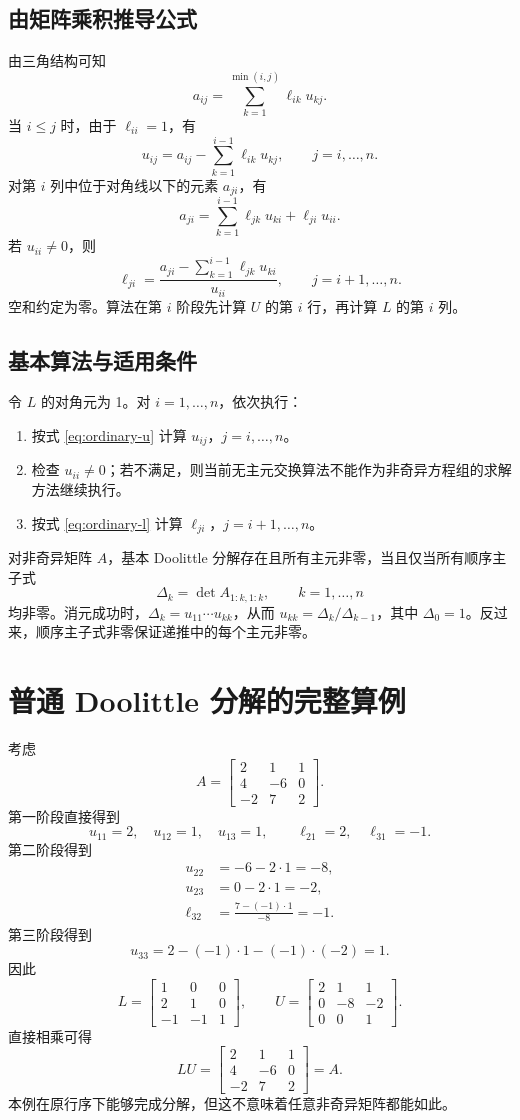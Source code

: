 \documentclass[UTF8,11pt,a4paper,fontset=fandol]{ctexart}
\newcommand{\mat}[1]{\begin{bmatrix}#1\end{bmatrix}}
\begin{document}
\subsection{由矩阵乘积推导公式}
由三角结构可知
\[
a_{ij}=\sum_{k=1}^{\min(i,j)}\ell_{ik}u_{kj}.
\]
当 $i\le j$ 时，由于 $\ell_{ii}=1$，有
\begin{equation}
\boxed{u_{ij}=a_{ij}-\sum_{k=1}^{i-1}\ell_{ik}u_{kj}},\qquad j=i,\ldots,n.
\label{eq:ordinary-u}
\end{equation}
对第 $i$ 列中位于对角线以下的元素 $a_{ji}$，有
\[
a_{ji}=\sum_{k=1}^{i-1}\ell_{jk}u_{ki}+\ell_{ji}u_{ii}.
\]
若 $u_{ii}\ne0$，则
\begin{equation}
\boxed{\ell_{ji}=\frac{a_{ji}-\sum_{k=1}^{i-1}\ell_{jk}u_{ki}}{u_{ii}}},\qquad j=i+1,\ldots,n.
\label{eq:ordinary-l}
\end{equation}
空和约定为零。算法在第 $i$ 阶段先计算 $U$ 的第 $i$ 行，再计算 $L$ 的第 $i$ 列。

\subsection{基本算法与适用条件}
令 $L$ 的对角元为 1。对 $i=1,\ldots,n$，依次执行：
\begin{enumerate}
\item 按式 \eqref{eq:ordinary-u} 计算 $u_{ij}$，$j=i,\ldots,n$。
\item 检查 $u_{ii}\ne0$；若不满足，则当前无主元交换算法不能作为非奇异方程组的求解方法继续执行。
\item 按式 \eqref{eq:ordinary-l} 计算 $\ell_{ji}$，$j=i+1,\ldots,n$。
\end{enumerate}
对非奇异矩阵 $A$，基本 Doolittle 分解存在且所有主元非零，当且仅当所有顺序主子式
\[
\Delta_k=\det A_{1:k,1:k},\qquad k=1,\ldots,n
\]
均非零。消元成功时，$\Delta_k=u_{11}\cdots u_{kk}$，从而 $u_{kk}=\Delta_k/\Delta_{k-1}$，其中 $\Delta_0=1$。反过来，顺序主子式非零保证递推中的每个主元非零。

\section{普通 Doolittle 分解的完整算例}
考虑
\[
A=\mat{2&1&1\\4&-6&0\\-2&7&2}.
\]
第一阶段直接得到
\[
u_{11}=2,\quad u_{12}=1,\quad u_{13}=1,\qquad
\ell_{21}=2,\quad \ell_{31}=-1.
\]
第二阶段得到
\begin{align*}
u_{22}&=-6-2\cdot1=-8,\\
u_{23}&=0-2\cdot1=-2,\\
\ell_{32}&=\frac{7-(-1)\cdot1}{-8}=-1.
\end{align*}
第三阶段得到
\[
u_{33}=2-(-1)\cdot1-(-1)\cdot(-2)=1.
\]
因此
\[
L=\mat{1&0&0\\2&1&0\\-1&-1&1},\qquad
U=\mat{2&1&1\\0&-8&-2\\0&0&1}.
\]
直接相乘可得
\[
LU=\mat{2&1&1\\4&-6&0\\-2&7&2}=A.
\]
本例在原行序下能够完成分解，但这不意味着任意非奇异矩阵都能如此。
\end{document}
